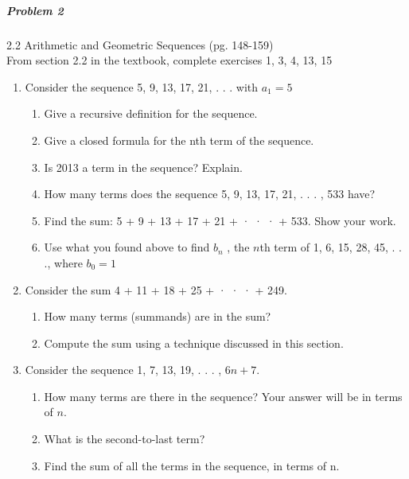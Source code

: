 \documentclass[11pt, a4paper]{article}
\newcommand\setItemNumber[1]{\setcounter{enumi}{\numexpr#1-1\relax}}
\begin{document}
	\subparagraph{Problem 2} 2.2 Arithmetic and Geometric Sequences (pg. 148-159)\\
	
		From section 2.2 in the textbook, complete exercises 1, 3, 4, 13, 15
	
        \begin{enumerate}

            \item Consider the sequence 5, 9, 13, 17, 21, . . . with $a_1 = 5$
                \begin{enumerate}

                \item Give a recursive definition for the sequence.
                \item Give a closed formula for the nth term of the sequence.
                \item Is 2013 a term in the sequence? Explain.
                \item How many terms does the sequence 5, 9, 13, 17, 21, . . . , 533 have?
                \item Find the sum: 5 + 9 + 13 + 17 + 21 + · · · + 533. Show your work.
                \item Use what you found above to find $b_n$ , the $n$th term of 1, 6, 15, 28, 45, . . ., where $b_0 = 1$
                \end{enumerate}


            \setItemNumber{3}
            \item Consider the sum 4 + 11 + 18 + 25 + · · · + 249.
                \begin{enumerate}
                    \item How many terms (summands) are in the sum?
                    \item Compute the sum using a technique discussed in this section.
                \end{enumerate}

            \item Consider the sequence 1, 7, 13, 19, . . . , $6n + 7$.
                \begin{enumerate}
                    \item How many terms are there in the sequence? Your answer will be in terms of $n$.
                    \item What is the second-to-last term?
                    \item Find the sum of all the terms in the sequence, in terms of n.
                \end{enumerate}



\end{enumerate}
\end{document}
